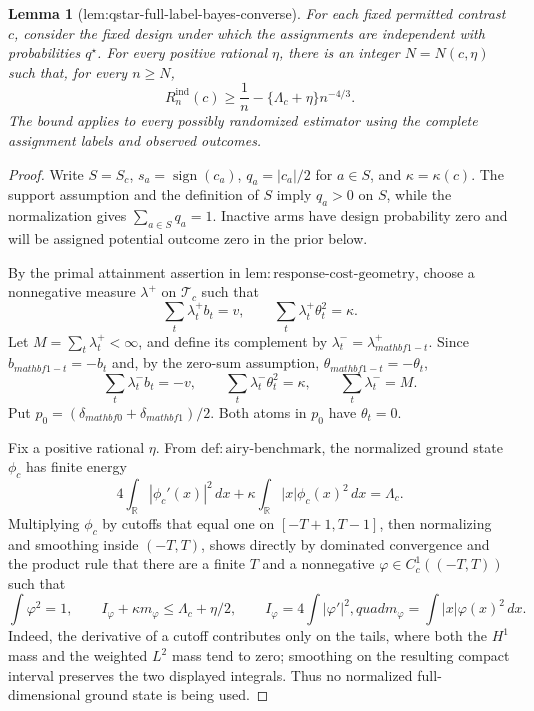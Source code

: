 \documentclass{article}
\newtheorem{lemma}{Lemma}
\begin{document}
{\begin{lemma}[lem:qstar-full-label-bayes-converse]\label{lem:qstar-full-label-bayes-converse}
For each fixed permitted contrast \(c\), consider the fixed design under which the assignments are independent with probabilities \(q^\star\).  For every positive rational \(\eta\), there is an integer \(N=N(c,\eta)\) such that, for every \(n\ge N\),
\[
R_n^{\mathrm{ind}}(c)
\ge \frac1n-\{\Lambda_c+\eta\}n^{-4/3}.
\]
The bound applies to every possibly randomized estimator using the complete assignment labels and observed outcomes.
\end{lemma}
\begin{proof}
Write \(S=S_c\), \(s_a=\operatorname{sign}(c_a)\), \(q_a=|c_a|/2\) for \(a\in S\), and \(\kappa=\kappa(c)\).  The support assumption and the definition of \(S\) imply \(q_a>0\) on \(S\), while the normalization gives \(\sum_{a\in S}q_a=1\).  Inactive arms have design probability zero and will be assigned potential outcome zero in the prior below.

By the primal attainment assertion in \(\mathrm{lem:response\text{-}cost\text{-}geometry}\), choose a nonnegative measure \(\lambda^+\) on \(\mathcal T_c\) such that
\[
\sum_t\lambda_t^+b_t=v,
\qquad
\sum_t\lambda_t^+\theta_t^2=\kappa.
\]
Let \(M=\sum_t\lambda_t^+<\infty\), and define its complement by
\(\lambda_t^-=\lambda_{mathbf1-t}^+\).  Since
\(b_{mathbf1-t}=-b_t\) and, by the zero-sum assumption,
\(\theta_{mathbf1-t}=-\theta_t\),
\[
\sum_t\lambda_t^-b_t=-v,
\qquad
\sum_t\lambda_t^-\theta_t^2=\kappa,
\qquad
\sum_t\lambda_t^-=M.
\]
Put \(p_0=(\delta_{mathbf0}+\delta_{mathbf1})/2\).  Both atoms in \(p_0\) have \(\theta_t=0\).

Fix a positive rational \(\eta\).  From \(\mathrm{def:airy\text{-}benchmark}\), the normalized ground state \(\phi_c\) has finite energy
\[
4\int_{\mathbb R}|\phi_c'(x)|^2\,dx
+\kappa\int_{\mathbb R}|x|\phi_c(x)^2\,dx=\Lambda_c.
\]
Multiplying \(\phi_c\) by cutoffs that equal one on \([-T+1,T-1]\), then normalizing and smoothing inside \((-T,T)\), shows directly by dominated convergence and the product rule that there are a finite \(T\) and a nonnegative \(\varphi\in C_c^1((-T,T))\) such that
\[
\int\varphi^2=1,
\qquad
I_\varphi+\kappa m_\varphi\le\Lambda_c+\eta/2,
\qquad
I_\varphi=4\int|\varphi'|^2,quad
m_\varphi=\int|x|\varphi(x)^2\,dx.
\]
Indeed, the derivative of a cutoff contributes only on the tails, where both the \(H^1\) mass and the weighted \(L^2\) mass tend to zero; smoothing on the resulting compact interval preserves the two displayed integrals.  Thus no normalized full-dimensional ground state is being used.


\end{proof}}
\end{document}
